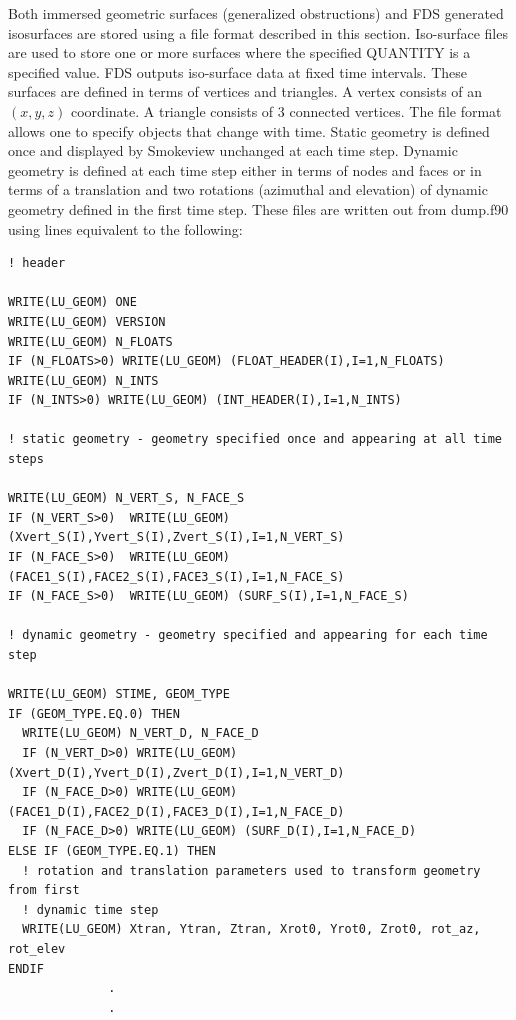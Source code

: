 \documentclass[11pt]{book}
\begin{document}
Both immersed geometric surfaces (generalized obstructions) and FDS generated isosurfaces are stored using a file format described in this section. Iso-surface files are used to store one or more surfaces where the specified {\ct QUANTITY} is a specified value. FDS outputs iso-surface data at fixed time intervals.  These surfaces are defined in terms of vertices and triangles.  A vertex consists of an $(x,y,z)$ coordinate. A triangle consists of 3 connected vertices.  The file format allows one to specify objects that change with time. Static geometry is defined once and displayed by Smokeview unchanged at each time step. Dynamic geometry is defined at each time step either in terms of nodes and faces or in terms of a translation and two rotations (azimuthal and elevation) of dynamic geometry defined in the first time step. These files are written out from {\ct dump.f90} using lines equivalent to the following:
\begin{lstlisting}
! header

WRITE(LU_GEOM) ONE
WRITE(LU_GEOM) VERSION
WRITE(LU_GEOM) N_FLOATS
IF (N_FLOATS>0) WRITE(LU_GEOM) (FLOAT_HEADER(I),I=1,N_FLOATS)
WRITE(LU_GEOM) N_INTS
IF (N_INTS>0) WRITE(LU_GEOM) (INT_HEADER(I),I=1,N_INTS)

! static geometry - geometry specified once and appearing at all time steps

WRITE(LU_GEOM) N_VERT_S, N_FACE_S
IF (N_VERT_S>0)  WRITE(LU_GEOM) (Xvert_S(I),Yvert_S(I),Zvert_S(I),I=1,N_VERT_S)
IF (N_FACE_S>0)  WRITE(LU_GEOM) (FACE1_S(I),FACE2_S(I),FACE3_S(I),I=1,N_FACE_S)
IF (N_FACE_S>0)  WRITE(LU_GEOM) (SURF_S(I),I=1,N_FACE_S)

! dynamic geometry - geometry specified and appearing for each time step

WRITE(LU_GEOM) STIME, GEOM_TYPE
IF (GEOM_TYPE.EQ.0) THEN
  WRITE(LU_GEOM) N_VERT_D, N_FACE_D
  IF (N_VERT_D>0) WRITE(LU_GEOM) (Xvert_D(I),Yvert_D(I),Zvert_D(I),I=1,N_VERT_D)
  IF (N_FACE_D>0) WRITE(LU_GEOM) (FACE1_D(I),FACE2_D(I),FACE3_D(I),I=1,N_FACE_D)
  IF (N_FACE_D>0) WRITE(LU_GEOM) (SURF_D(I),I=1,N_FACE_D)
ELSE IF (GEOM_TYPE.EQ.1) THEN
  ! rotation and translation parameters used to transform geometry from first
  ! dynamic time step
  WRITE(LU_GEOM) Xtran, Ytran, Ztran, Xrot0, Yrot0, Zrot0, rot_az, rot_elev
ENDIF
              .
              .
\end{lstlisting}
\end{document}
